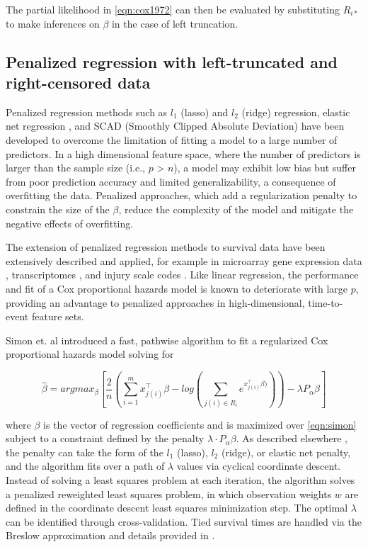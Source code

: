 \documentclass[11pt,final,fleqn]{article}\usepackage[]{graphicx}\usepackage[]{color}
\theoremstyle{plain}
\begin{document}
The partial likelihood in \autoref{eqn:cox1972} can then be evaluated by substituting $R_{i\ast}$ to make inferences on $\beta$ in the case of left truncation. 

\subsection{Penalized regression with left-truncated and right-censored data}
Penalized regression methods such as $l_1$ (lasso) \cite{tibshirani1996regression} and $l_2$ (ridge) \cite{tikhonov1963ridge} regression, elastic net regression \cite{zou2005regularization}, and SCAD (Smoothly Clipped Absolute Deviation) \cite{xie2009scad} have been developed to overcome the limitation of fitting a model to a large number of predictors. In a high dimensional feature space, where the number of predictors is larger than the sample size (i.e., $p$ > $n$), a model may exhibit low bias but suffer from poor prediction accuracy and limited generalizability, a consequence of overfitting the data. Penalized approaches, which add a regularization penalty to constrain the size of the $\beta$, reduce the complexity of the model and mitigate the negative effects of overfitting.

The extension of penalized regression methods to survival data have been extensively described and applied, for example in microarray gene expression data \cite{gui2005penalized}, transcriptomes \cite{wu2011penalized}, and injury scale codes \cite{mittal2013penalized}. Like linear regression, the performance and fit of a Cox proportional hazards model is known to deteriorate with large $p$, providing an advantage to penalized approaches in high-dimensional, time-to-event feature sets.

Simon et. al\cite{simon2011regularization} introduced a fast, pathwise algorithm to fit a regularized Cox proportional hazards model solving for 

\begin{equation} \label{eqn:simon}
\hat{\beta} = argmax_{\beta}  \left[ \frac{2}{n} \left( \sum_{i=1}^m x_{j(i)}^\intercal\beta - log\left(\sum_{j(i)\in R_i}  e^{x_{j(i)}^\intercal\beta)}\right) \right)  - \lambda P_{\alpha}\beta  \right] 
\end{equation}

where $\beta$ is the vector of regression coefficients and is maximized over \autoref{eqn:simon} subject to a constraint defined by the penalty $\lambda \cdot P_{\alpha}\beta$. As described elsewhere \cite{simon2011regularization}, the penalty can take the form of the $l_1$ (lasso), $l_2$ (ridge), or elastic net penalty,  and the algorithm fits over a path of $\lambda$ values via cyclical coordinate descent. Instead of solving a least squares problem at each iteration, the algorithm solves a penalized reweighted least squares problem, in which observation weights $w$ are defined in the coordinate descent least squares minimization step. The optimal $\lambda$ can be identified through cross-validation. Tied survival times are handled via the Breslow approximation \cite{breslow1972} and details provided in \cite{simon2011regularization}.
\end{document}
